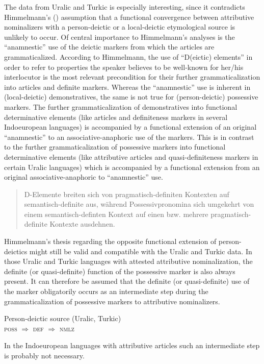 {The data from Uralic and Turkic is especially interesting, since it contradicts Himmelmann's (\citeyear[220–221]{himmelmann1997}) assumption that a functional convergence between attributive nominalizers with a person-deictic or a local-deictic etymological source is unlikely to occur. Of central importance to Himmelmann's analyses is the “anamnestic” use of the deictic markers from which the articles are grammaticalized. According to Himmelmann, the use of “D(eictic) elements” in order to refer to properties the speaker believes to be well-known for her/his interlocutor is the most relevant precondition for their further grammaticalization into articles and definite markers. Whereas the “anamnestic” use is inherent in (local-deictic) demonstratives, the same is not true for (person-deictic) possessive markers. The further grammaticalization of demonstratives into functional determinative elements (like articles and definiteness markers in several Indoeuropean languages) is accompanied by a functional extension of an original “anamnestic” to an associative-anaphoric use of the markers. This is in contrast to the further grammaticalization of possessive markers into functional determinative elements (like attributive articles and quasi-definiteness markers in certain Uralic languages) which is accompanied by a functional extension from an original associative-anaphoric to “anamnestic” use.
\begin{quote}
D-Elemente breiten sich von pragmatisch-definiten Kontexten auf semantisch-definite aus, während Possessivpronomina sich umgekehrt von einem semantisch-definten Kontext auf einen bzw. mehrere pragmatisch-definite Kontexte ausdehnen. \cite[221]{himmelmann1997}
\end{quote}
Himmelmann's thesis regarding the opposite functional extension of person-deictics might still be valid and compatible with the Uralic and Turkic data. In those Uralic and Turkic languages with attested attributive nominalization, the definite (or quasi-definite) function of the possessive marker is also always present. It can therefore be assumed that the definite (or quasi-definite) use of the marker obligatorily occurs as an intermediate step during the grammaticalization of possessive markers to attributive nominalizers.
\begin{exe}
\ex Person-deictic source (Uralic, Turkic)\\
\textsc{poss $\Rightarrow$ def $\Rightarrow$ nmlz}
\end{exe}
In the Indoeuropean languages with attributive articles such an intermediate step is probably not necessary.
}
